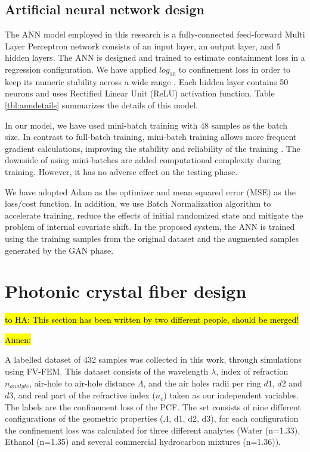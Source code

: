 \documentclass[10pt]{IEEEtran}
\begin{document}
\subsection{Artificial neural network design}
\label{ssec:ann}

The ANN model employed in this research is a fully-connected feed-forward Multi Layer Perceptron network consists of an input layer, an output layer, and 5 hidden layers. The ANN is designed and trained to estimate containment loss in a regression configuration. We have applied $log_{10}$ to confinement loss in order to keep its numeric stability across a wide range \cite{paper0}. Each hidden layer contains 50 neurons and uses Rectified Linear Unit (ReLU) activation function. Table \ref{tbl:anndetails} summarizes the details of this model.

In our model, we have used mini-batch training with 48 samples as the batch size. In contrast to full-batch training, mini-batch training allows more frequent gradient calculations, improving the stability and reliability of the training \cite{masters2018revisiting, keskar2016large}. The downside of using mini-batches are added computational complexity during training. However, it has no adverse effect on the testing phase.

We have adopted Adam \cite{kingma2014adam} as the optimizer and mean squared error (MSE) as the loss/cost function. In addition, we use Batch Normalization algorithm \cite{ioffe2015batch} to accelerate training, reduce the effects of initial randomized state and mitigate the problem of internal covariate shift. In the proposed system, the ANN is trained using the training samples from the original dataset and the augmented samples generated by the GAN phase.


\section{Photonic crystal fiber design}
\label{sec:pcf}

\hl{to HA: This section has been written by two different people, should be merged!}

\hl{Aimen:}

A labelled dataset of 432 samples was collected in this work, through simulations using FV-FEM. This dataset consists of the wavelength $\lambda$, index of refraction $n_{analyte} $, air-hole to air-hole distance $ \Lambda $, and the air holes radii per ring $d1$, $d2$ and $d3$, and real part of the refractive index ($n_c$) taken as our independent variables. The labels are the confinement loss of the PCF. The set consists of nine different configurations of the geometric properties ($ \Lambda $, d1, d2, d3), for each configuration the confinement loss was calculated for three different analytes (Water (n=1.33), Ethanol (n=1.35) and several commercial hydrocarbon mixtures (n=1.36)).
\end{document}

